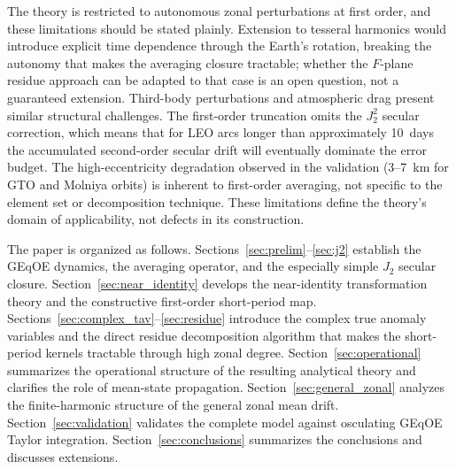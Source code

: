 The theory is restricted to autonomous zonal perturbations at first order,
and these limitations should be stated plainly.
Extension to tesseral harmonics would introduce explicit time dependence
through the Earth's rotation, breaking the autonomy that makes the
averaging closure tractable; whether the $F$-plane residue approach can be
adapted to that case is an open question, not a guaranteed extension.
Third-body perturbations and atmospheric drag present similar structural
challenges.  The first-order truncation omits the $J_2^2$ secular
correction, which means that for LEO arcs longer than approximately
10~days the accumulated second-order secular drift will eventually dominate
the error budget.  The high-eccentricity degradation observed in the
validation (3--7~km for GTO and Molniya orbits) is inherent to first-order
averaging, not specific to the element set or decomposition technique.
These limitations define the theory's domain of applicability, not defects
in its construction.

The paper is organized as follows.
Sections~\ref{sec:prelim}--\ref{sec:j2} establish the GEqOE dynamics, the
averaging operator, and the especially simple $J_2$ secular closure.
Section~\ref{sec:near_identity} develops the near-identity transformation
theory and the constructive first-order short-period map.
Sections~\ref{sec:complex_tav}--\ref{sec:residue} introduce the complex
true anomaly variables and the direct residue decomposition algorithm that
makes the short-period kernels tractable through high zonal degree.
Section~\ref{sec:operational} summarizes the operational structure of the
resulting analytical theory and clarifies the role of mean-state propagation.
Section~\ref{sec:general_zonal} analyzes the finite-harmonic structure of
the general zonal mean drift.
Section~\ref{sec:validation} validates the complete model against osculating
GEqOE Taylor integration.
Section~\ref{sec:conclusions} summarizes the conclusions and discusses
extensions.

